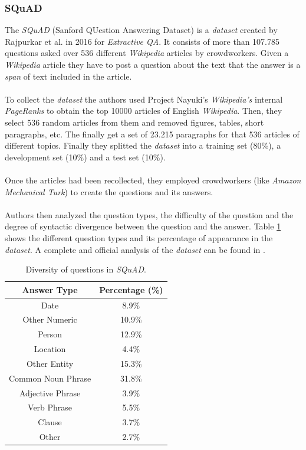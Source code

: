 \subsubsection{SQuAD}
\label{sec:squad}
The \emph{SQuAD} (Sanford QUestion Answering Dataset)\cite{Rajpurkar2016} is a \emph{dataset} created by Rajpurkar et al. in 2016 for \emph{Extractive QA}. It consists of more than 107.785 questions asked over 536 different \emph{Wikipedia} articles by crowdworkers. Given a \emph{Wikipedia} article they have to post a question about the text that the answer is a \emph{span} of text included in the article.
\paragraph{}
To collect the \emph{dataset} the authors used Project Nayuki's \emph{Wikipedia's} internal \emph{PageRanks} to obtain the top 10000 articles of English \emph{Wikipedia}. Then, they select 536 random articles from them and removed figures, tables, short paragraphs, etc. The finally get a set of 23.215 paragraphs for that 536 articles of different topics. Finally they splitted the \emph{dataset} into a training set (80\%), a development set (10\%) and a test set (10\%).
\paragraph{}
Once the articles had been recollected, they employed crowdworkers (like \emph{Amazon Mechanical Turk}) to create the questions and its answers. 
\paragraph{}
Authors then analyzed the question types, the difficulty of the question and the degree of syntactic divergence between the question and the answer. Table \ref{tab:squad-types} shows the different question types and its percentage of appearance in the \emph{dataset}. A complete and official analysis of the \emph{dataset} can be found in \cite{Rajpurkar2016}.
\begin{table}[!h]
	\centering
	\begin{tabular}{|c|c|}
	\hline 
	Answer Type & Percentage (\%) \\ 
	\hline 
	Date  & 8.9\% \\ 
	\hline 
	Other Numeric & 10.9\% \\ 
	\hline 
	Person & 12.9\% \\ 
	\hline 
	Location & 4.4\% \\ 
	\hline 
	Other Entity & 15.3\% \\ 
	\hline 
	Common Noun Phrase & 31.8\% \\ 
	\hline 
	Adjective Phrase & 3.9\% \\ 
	\hline 
	Verb Phrase & 5.5\% \\ 
	\hline 
	Clause & 3.7\% \\ 
	\hline 
	Other & 2.7\% \\ 
	\hline 
	\end{tabular} 
	\caption{Diversity of questions in \emph{SQuAD}.}
	\label{tab:squad-types}
\end{table}
